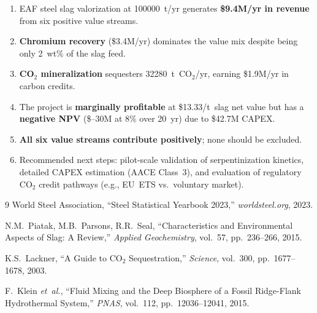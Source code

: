 \documentclass[11pt,a4paper]{article}
\begin{document}
\begin{enumerate}
  \item EAF steel slag valorization at \num{100000}~t/yr generates \textbf{\$9.4M/yr in revenue}
        from six positive value streams.
  \item \textbf{Chromium recovery} (\$3.4M/yr) dominates the value mix despite being
        only 2~wt\% of the slag feed.
  \item \textbf{CO$_2$ mineralization} sequesters \num{32280}~t~CO$_2$/yr,
        earning \$1.9M/yr in carbon credits.
  \item The project is \textbf{marginally profitable} at \$13.33/t~slag net value
        but has a \textbf{negative NPV} (\$--30M at 8\% over 20~yr) due to
        \$42.7M CAPEX.
  \item \textbf{All six value streams contribute positively}; none should be excluded.
  \item Recommended next steps: pilot-scale validation of serpentinization kinetics,
        detailed CAPEX estimation (AACE Class~3), and evaluation of regulatory
        CO$_2$ credit pathways (e.g., EU~ETS vs.\ voluntary market).
\end{enumerate}

\begin{thebibliography}{9}
World Steel Association, ``Steel Statistical Yearbook 2023,''
\emph{worldsteel.org}, 2023.

N.M.~Piatak, M.B.~Parsons, R.R.~Seal, ``Characteristics and Environmental
Aspects of Slag: A Review,'' \emph{Applied Geochemistry}, vol.~57,
pp.~236--266, 2015.

K.S.~Lackner, ``A Guide to CO$_2$ Sequestration,'' \emph{Science}, vol.~300,
pp.~1677--1678, 2003.

F.~Klein \emph{et~al.}, ``Fluid Mixing and the Deep Biosphere of a Fossil
Ridge-Flank Hydrothermal System,'' \emph{PNAS}, vol.~112, pp.~12036--12041, 2015.
\end{thebibliography}
\end{document}
